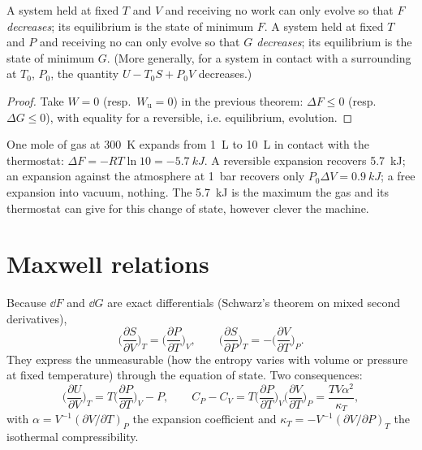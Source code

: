 \begin{theorem}\label{thm:b2:thermodynamic-potentials:criteria}
A system held at fixed $T$ and $V$ and receiving no work can only
evolve so that \emph{$F$ decreases}; its equilibrium is the state of
minimum $F$. A system held at fixed $T$ and $P$ and receiving no  can only evolve so that \emph{$G$ decreases}; its equilibrium is
the state of minimum $G$. (More generally, for a system in contact with
a surrounding at $T_0$, $P_0$, the quantity $U - T_0S + P_0V$ decreases.)
\end{theorem}

\begin{proof}
Take $W = 0$ (resp.\ $W_{\text{u}} = 0$) in the previous theorem: $\Delta F
\le 0$ (resp.\ $\Delta G \le 0$), with equality for a reversible, i.e.
equilibrium, evolution.
\end{proof}

\begin{example}\label{ex:b2:thermodynamic-potentials:expansion}
One mole of gas at \qty{300}{K} expands from \qty{1}{L} to \qty{10}{L} in
contact with the thermostat: $\Delta F = -RT\ln 10 = \qty{-5.7}{kJ}$. A
reversible expansion recovers \qty{5.7}{kJ}; an expansion against the
atmosphere at \qty{1}{bar} recovers only $P_0\Delta V = \qty{0.9}{kJ}$; a
free expansion into vacuum, nothing. The \qty{5.7}{kJ} is the maximum
the gas and its thermostat can give for this change of state, however
clever the machine.
\end{example}

\section{Maxwell relations}

\begin{theorem}\label{thm:b2:thermodynamic-potentials:maxwell}
Because $\dd F$ and $\dd G$ are exact differentials (Schwarz's theorem
on mixed second derivatives),
\[
\Big(\frac{\partial S}{\partial V}\Big)_T = \Big(\frac{\partial P}{\partial T}\Big)_V,
\qquad
\Big(\frac{\partial S}{\partial P}\Big)_T = -\Big(\frac{\partial V}{\partial T}\Big)_P .
\]
They express the unmeasurable (how the entropy varies with volume or
pressure at fixed temperature) through the equation of state. Two
consequences:
\[
\Big(\frac{\partial U}{\partial V}\Big)_T = T\Big(\frac{\partial P}{\partial T}\Big)_V - P,
\qquad
C_P - C_V = T\Big(\frac{\partial P}{\partial T}\Big)_V\Big(\frac{\partial V}{\partial T}\Big)_P
= \frac{TV\alpha^2}{\kappa_T} ,
\]
with $\alpha = V^{-1}(\partial V/\partial T)_P$ the expansion coefficient and
$\kappa_T = -V^{-1}(\partial V/\partial P)_T$ the isothermal compressibility.
\end{theorem}

